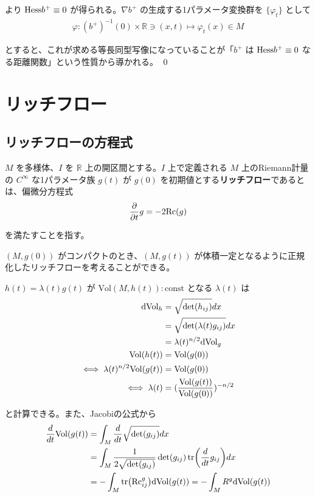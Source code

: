 \documentclass[dvipdfmx,a4paper]{jsreport}
\theoremstyle{definition}
\newcommand{\der}{\partial}
\newcommand{\Vol}{{\rm Vol}}
\newcommand{\dVol}{{\rm dVol}}
\newcommand{\Rc}{{\rm Rc}}
\newcommand{\Hess}{{\rm Hess}}
\renewcommand{\phi}{\varphi}
\newcommand{\R}{\mathbb{R}}
\begin{document}
より $\Hess b^+ \equiv 0$ が得られる。$\nabla b^+$ の生成する1パラメータ変換群を $\{\phi_t\}$ として
\begin{align*}
    \phi:(b^+)^{-1}(0) \times \R \ni (x,t) \mapsto \phi_t(x) \in M
\end{align*}

とすると、これが求める等長同型写像になっていることが「$b^+$ は $\Hess b^+ \equiv 0$ なる距離関数」という性質から導かれる。 \qed







\newpage

\chapter{リッチフロー}

\section{リッチフローの方程式}

 $M$ を多様体、$I$ を $\R$ 上の開区間とする。$I$ 上で定義される $M$ 上のRiemann計量の $C^\infty$ な1パラメータ族 $g(t)$ が $g(0)$ を初期値とする\textbf{リッチフロー}であるとは、偏微分方程式
\begin{align*}
    {\der \over \der t}g=-2\Rc(g)
\end{align*}

を満たすことを指す。

$(M,g(0))$ がコンパクトのとき、$(M,g(t))$ が体積一定となるように正規化したリッチフローを考えることができる。

$h(t)=\lambda(t)g(t)$ が $\mbox{Vol}(M,h(t)):\mbox{const}$ となる $\lambda(t)$ は
\begin{align*}
    \dVol_h &= \sqrt{\det(h_{ij})}dx \\
    &= \sqrt{\det(\lambda(t)g_{ij})}dx \\
    &= \lambda(t)^{n/2}\dVol_g \\
    \Vol(h(t)) &= \Vol(g(0)) \\
    \iff \lambda(t)^{n/2}\Vol(g(t)) &= \Vol(g(0)) \\
    \iff \lambda(t) &= ({\Vol(g(t)) \over \Vol(g(0))})^{-n/2}
\end{align*}

と計算できる。また、Jacobiの公式から
\begin{align*}
    {d \over dt}\Vol(g(t)) &= \int_M {d \over dt}\sqrt{\det(g_{ij})} dx \\
    &= \int_M {1 \over 2\sqrt{\det(g_{ij})}}\det(g_{ij})\tr({d \over dt}g_{ij}) dx \\
    &= -\int_M \tr(\Rc^g_{ij}) \dVol(g(t)) = -\int_M R^g \dVol(g(t)) \\
\end{align*}
\end{document}
